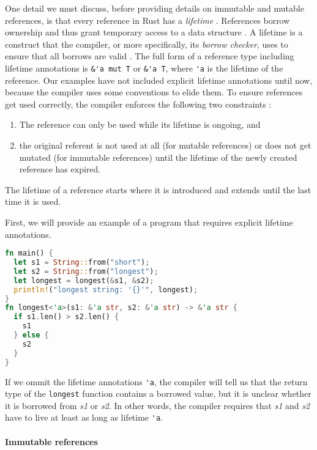 \documentclass[sigplan,11pt,nonacm]{acmart}
\begin{document}
One detail we must discuss, before providing details on immutable and mutable references, is that every reference in Rust has a \emph{lifetime} \cite{rust-book}.
References borrow ownership and thus grant temporary access to a data structure \cite{understanding-evolving-rust}.
A lifetime is a construct that the compiler, or more specifically, its \emph{borrow checker}, uses to ensure that all borrows are valid \cite{rust-by-example}.
The full form of a reference type including lifetime annotations is \verb|&'a mut T| or \verb|&'a T|, where \verb|'a| is the lifetime of the reference.
Our examples have not included explicit lifetime annotations until now, because the compiler uses some conventions to elide them.
To ensure references get used correctly, the compiler enforces the following two constraints \cite{understanding-evolving-rust}:
\begin{enumerate}
  \item The reference can only be used while its lifetime is ongoing, and
  \item the original referent is not used at all (for mutable references) or does not get mutated (for immutable references) until the lifetime of the newly created reference has expired.
\end{enumerate}
The lifetime of a reference starts where it is introduced and extends until the last time it is used.

First, we will provide an example of a program that requires explicit lifetime annotations.

\begin{lstlisting}[language=Rust]
fn main() {
  let s1 = String::from("short");
  let s2 = String::from("longest");
  let longest = longest(&s1, &s2);
  println!("longest string: '{}'", longest);
}
fn longest<'a>(s1: &'a str, s2: &'a str) -> &'a str {
  if s1.len() > s2.len() {
    s1
  } else {
    s2
  }
}
\end{lstlisting}
If we ommit the lifetime annotations \verb|'a|, the compiler will tell us that the return type of the \verb|longest| function contains a borrowed value, but it is unclear whether it is borrowed from \emph{s1} or \emph{s2}.
In other words, the compiler requires that \emph{s1} and \emph{s2} have to live at least as long as lifetime \verb|'a|.


\paragraph{Immutable references}
\end{document}
